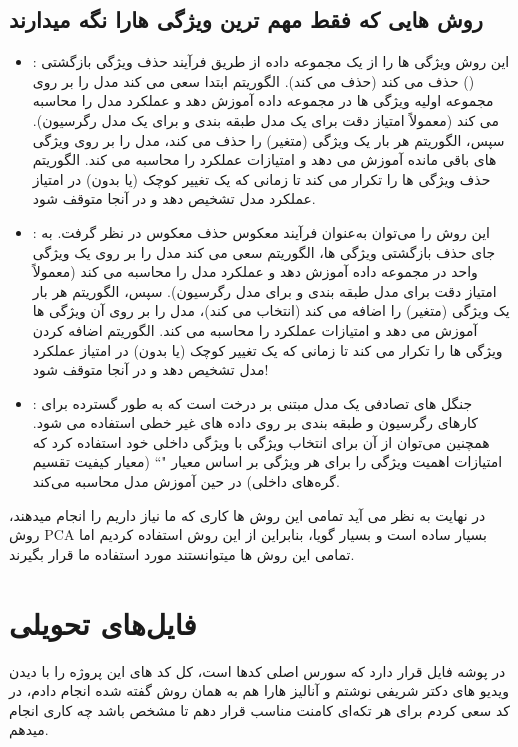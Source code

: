 \documentclass[12pt]{article}
\begin{document}
  \subsection{روش هایی که فقط مهم ترین ویژگی هارا نگه میدارند}
\begin{itemize}
	
	\item 
	:
	این روش ویژگی ها را از یک مجموعه داده از طریق فرآیند حذف ویژگی بازگشتی () حذف می کند (حذف می کند). الگوریتم ابتدا سعی می کند مدل را بر روی مجموعه اولیه ویژگی ها در مجموعه داده آموزش دهد و عملکرد مدل را محاسبه می کند (معمولاً امتیاز دقت برای یک مدل طبقه بندی و  برای یک مدل رگرسیون). سپس، الگوریتم هر بار یک ویژگی (متغیر) را حذف می کند، مدل را بر روی ویژگی های باقی مانده آموزش می دهد و امتیازات عملکرد را محاسبه می کند. الگوریتم حذف ویژگی ها را تکرار می کند تا زمانی که یک تغییر کوچک (یا بدون) در امتیاز عملکرد مدل تشخیص دهد و در آنجا متوقف شود.
	\item 
	:
	این روش را می‌توان به‌عنوان فرآیند معکوس حذف معکوس در نظر گرفت. به جای حذف بازگشتی ویژگی ها، الگوریتم سعی می کند مدل را بر روی یک ویژگی واحد در مجموعه داده آموزش دهد و عملکرد مدل را محاسبه می کند (معمولاً امتیاز دقت برای مدل طبقه بندی و  برای مدل رگرسیون). سپس، الگوریتم هر بار یک ویژگی (متغیر) را اضافه می کند (انتخاب می کند)، مدل را بر روی آن ویژگی ها آموزش می دهد و امتیازات عملکرد را محاسبه می کند. الگوریتم اضافه کردن ویژگی ها را تکرار می کند تا زمانی که یک تغییر کوچک (یا بدون) در امتیاز عملکرد مدل تشخیص دهد و در آنجا متوقف شود!
	\item 
	:
	جنگل های تصادفی یک مدل مبتنی بر درخت است که به طور گسترده برای کارهای رگرسیون و طبقه بندی بر روی داده های غیر خطی استفاده می شود. همچنین می‌توان از آن برای انتخاب ویژگی با ویژگی  داخلی خود استفاده کرد که امتیازات اهمیت ویژگی را برای هر ویژگی بر اساس معیار "`` (معیار کیفیت تقسیم گره‌های داخلی) در حین آموزش مدل محاسبه می‌کند.
	
\end{itemize}
در نهایت به نظر می آید تمامی این روش ها کاری که ما نیاز داریم را انجام میدهند، روش PCA بسیار ساده است و بسیار گویا، بنابراین از این روش استفاده کردیم اما تمامی این روش ها میتوانستند مورد استفاده ما قرار بگیرند.

    
   \section{فایل‌های تحویلی}
   در پوشه   فایل   قرار دارد که سورس اصلی کدها است، کل کد های این پروژه را با دیدن ویدیو های دکتر شریفی نوشتم و آنالیز هارا هم  به همان روش گفته شده انجام دادم، در کد سعی کردم برای هر تکه‌ای کامنت مناسب قرار دهم تا مشخص باشد چه کاری انجام میدهم.
   
\end{document}
